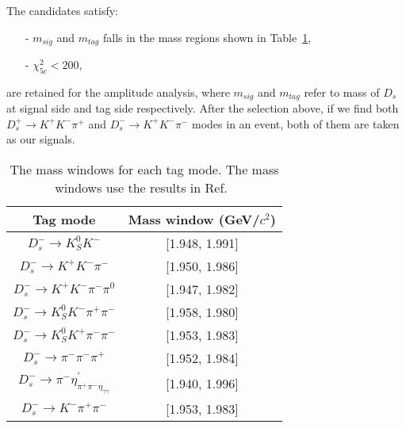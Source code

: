 {The candidates satisfy:
\begin{itemize}
    \item[-] $m_{sig}$ and $m_{tag}$ falls in the mass regions shown in Table~\ref{ST-mass-window}, 
	\item[-] $\chi_{5c}^{2} < 200 $, 
\end{itemize}
are retained for the amplitude analysis, where $m_{sig}$ and $m_{tag}$ refer to mass of $D_{s}$ at signal side and tag side respectively.
After the selection above, if we find both $D_{s}^{+} \rightarrow K^{+}K^{-}\pi^{+}$ and $D_{s}^{-} \rightarrow K^{+}K^{-}\pi^{-}$ modes in an event, both of them are taken as our signals.
\begin{table}[htbp]
    \caption{ The mass windows for each tag mode. The mass windows use the results in Ref.~\cite{Doc-DB-630-v35} }
    \label{ST-mass-window}
    \begin{center}
        \begin{tabular}{cc}
            \toprule\toprule
            Tag mode & Mass window (GeV/$c^{2}$)  \\
            \hline
            $D_{s}^{-} \rightarrow K_{S}^{0}K^{-}$                          & [1.948, 1.991]    \\
            $D_{s}^{-} \rightarrow K^{+}K^{-}\pi^{-}$                       & [1.950, 1.986]    \\
            $D_{s}^{-} \rightarrow K^{+}K^{-}\pi^{-}\pi^{0}$                & [1.947, 1.982]    \\
            $D_{s}^{-} \rightarrow K_{S}^{0}K^{-}\pi^{+}\pi^{-}$            & [1.958, 1.980]    \\
            $D_{s}^{-} \rightarrow K_{S}^{0}K^{+}\pi^{-}\pi^{-}$            & [1.953, 1.983]    \\
            $D_{s}^{-} \rightarrow \pi^{-}\pi^{-}\pi^{+}$                   & [1.952, 1.984]    \\
            $D_{s}^{-} \rightarrow \pi^{-}\eta_{\pi^{+}\pi^{-}\eta_{\gamma\gamma}}^{'}$  & [1.940, 1.996]        \\
            $D_{s}^{-} \rightarrow K^{-}\pi^{+}\pi^{-}$                     & [1.953, 1.983]    \\
            \bottomrule\bottomrule
        \end{tabular}
    \end{center}
\end{table}

}

